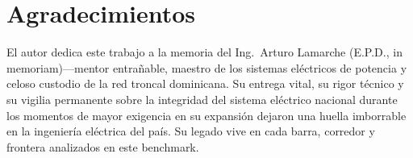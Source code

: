 \documentclass[11pt, journal, onecolumn]{IEEEtran}
\begin{document}
\section*{Agradecimientos}
El autor dedica este trabajo a la memoria del Ing.~Arturo Lamarche (E.P.D., in memoriam)---mentor entrañable, maestro de los sistemas eléctricos de potencia y celoso custodio de la red troncal dominicana. Su entrega vital, su rigor técnico y su vigilia permanente sobre la integridad del sistema eléctrico nacional durante los momentos de mayor exigencia en su expansión dejaron una huella imborrable en la ingeniería eléctrica del país. Su legado vive en cada barra, corredor y frontera analizados en este benchmark.



\end{document}
